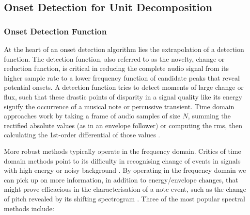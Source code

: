 \subsection{Onset Detection for Unit Decomposition}

%

\subsubsection{Onset Detection Function}

At the heart of an onset detection algorithm lies the extrapolation of a detection function. The detection function, also referred to as the novelty, change or reduction function, is critical in reducing the complete audio signal from its higher sample rate to a lower frequency function of candidate peaks that reveal potential onsets. A detection function tries to detect moments of large change or flux, such that these drastic points of disparity in a signal quality like its energy signify the occurrence of a musical note or percussive transient. Time domain approaches work by taking a frame of audio samples of size $N$, summing the rectified absolute values (as in an envelope follower) or computing the \acrfull{rms}, then calculating the 1st-order differential of those values \citep{Laroche2003, Duxbury2002}.

More robust methods typically operate in the frequency domain. Critics of time domain methods point to its difficulty in recognising change of events in signals with high energy or noisy background \citep{Grzywczak2014, Eyben2010}. By operating in the frequency domain we can pick up on more information, in addition to energy/envelope changes, that might prove efficacious in the characterisation of a note event, such as the change of pitch revealed by its shifting spectrogram \citep{Schloss1985, Lerch2012}. Three of the most popular spectral methods include:


